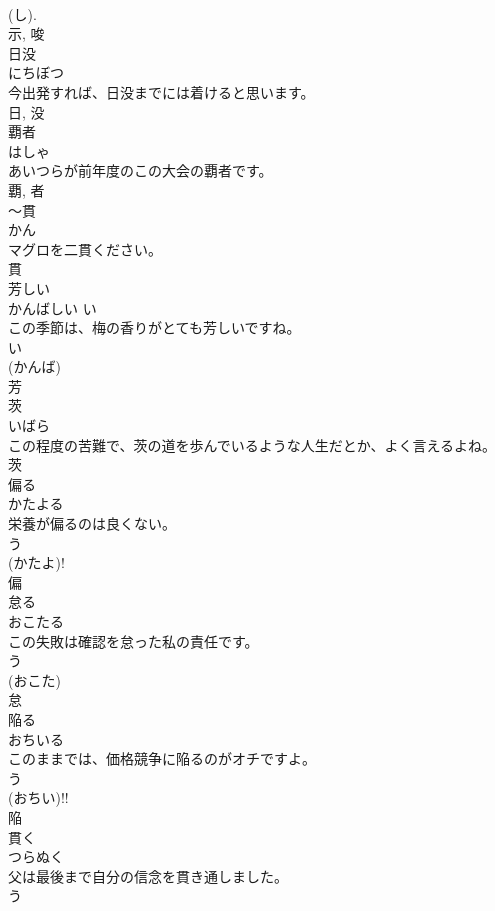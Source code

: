 \documentclass[8pt]{extreport}
\begin{document}
\begin{CJK}{UTF8}{min}
\\	(し). 
\\	示, 唆	
\\	日没	
\\	にちぼつ	
\\	今出発すれば、日没までには着けると思います。	
\\	日, 没	
\\	覇者	
\\	はしゃ	
\\	あいつらが前年度のこの大会の覇者です。	
\\	覇, 者	
\\	〜貫	
\\	かん	
\\	マグロを二貫ください。	
\\	貫	
\\	芳しい	
\\	かんばしい	い 
\\	この季節は、梅の香りがとても芳しいですね。	
\\	い 
\\	(かんば) 
\\	芳	
\\	茨	
\\	いばら	
\\	この程度の苦難で、茨の道を歩んでいるような人生だとか、よく言えるよね。	
\\	茨	
\\	偏る	
\\	かたよる	
\\	栄養が偏るのは良くない。	
\\	う 
\\	(かたよ)! 
\\	偏	
\\	怠る	
\\	おこたる	
\\	この失敗は確認を怠った私の責任です。	
\\	う 
\\	(おこた)
\\	怠	
\\	陥る	
\\	おちいる	
\\	このままでは、価格競争に陥るのがオチですよ。	
\\	う 
\\	(おちい)!!
\\	陥	
\\	貫く	
\\	つらぬく	
\\	父は最後まで自分の信念を貫き通しました。	
\\	う 

\end{CJK}
\end{document}
